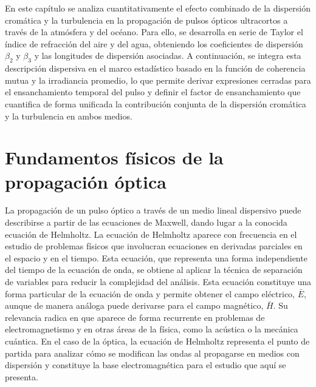 \label{chp:ManLaTeX}
\minitoc

\begin{sinopsis}\label{sec:chpltx:sinop}
En este capítulo se analiza cuantitativamente el efecto combinado de la dispersión cromática y la turbulencia en la propagación de pulsos ópticos ultracortos a través de la atmósfera y del océano. Para ello, se desarrolla en serie de Taylor el índice de refracción del aire y del agua, obteniendo los coeficientes de dispersión $\beta_2$ y $\beta_3$ y las longitudes de dispersión asociadas. A continuación, se integra esta descripción dispersiva en el marco estadístico basado en la función de coherencia mutua y la irradiancia promedio, lo que permite derivar expresiones cerradas para el ensanchamiento temporal del pulso y definir el factor de ensanchamiento que cuantifica de forma unificada la contribución conjunta de la dispersión cromática y la turbulencia en ambos medios. 
\end{sinopsis}

\section{Fundamentos físicos de la propagación óptica}
La propagación de un pulso óptico a través de un medio lineal dispersivo puede describirse a partir de las ecuaciones de Maxwell, dando lugar a la conocida ecuación de Helmholtz. La ecuación de Helmholtz aparece con frecuencia en el estudio de problemas físicos que involucran ecuaciones en derivadas parciales en el espacio y en el tiempo. Esta ecuación, que representa una forma independiente del tiempo de la ecuación de onda, se obtiene al aplicar la técnica de separación de variables para reducir la complejidad del análisis. Esta ecuación constituye una forma particular de la ecuación de onda y permite obtener el campo eléctrico, $\bar{E}$, aunque de manera análoga puede derivarse para el campo magnético, $\bar{H}$. Su relevancia radica en que aparece de forma recurrente en problemas de electromagnetismo y en otras áreas de la física, como la acústica o la mecánica cuántica. En el caso de la óptica, la ecuación de Helmholtz representa el punto de partida para analizar cómo se modifican las ondas al propagarse en medios con dispersión y constituye la base electromagnética para el estudio que aquí se presenta.

